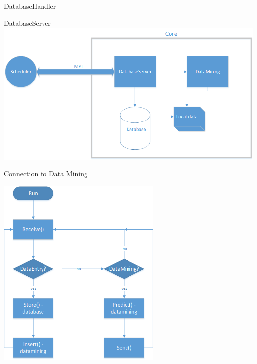 \begin{frame}{DatabaseHandler}
	\end{frame}
	
	\begin{frame}{DatabaseServer}
	\includegraphics[width=1.0\textwidth]{images/Zeichnung6.png}
	\end{frame}
	
	\begin{frame}{Connection to Data Mining}
	\begin{center}
	\includegraphics[height=0.64\textwidth, width=0.6\textwidth]{images/datamining_flow.png}
	\end{center}
	\end{frame}
	
